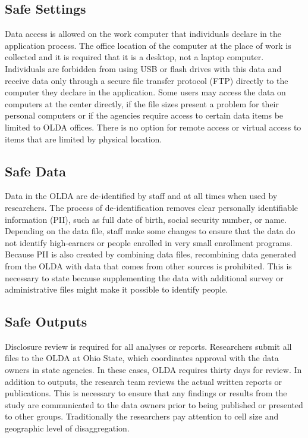 \hypertarget{safe-settings-1}{%
\subsection{Safe Settings}\label{safe-settings-1}}

Data access is allowed on the work computer that individuals declare in the application process. The office location of the computer at the place of work is collected and it is required that it is a desktop, not a laptop computer. Individuals are forbidden from using USB or flash drives with this data and receive data only through a secure file transfer protocol (FTP) directly to the computer they declare in the application. Some users may access the data on computers at the center directly, if the file sizes present a problem for their personal computers or if the agencies require access to certain data items be limited to OLDA offices. There is no option for remote access or virtual access to items that are limited by physical location.

\hypertarget{safe-data-1}{%
\subsection{Safe Data}\label{safe-data-1}}

Data in the OLDA are de-identified by staff and at all times when used by researchers. The process of de-identification removes clear personally identifiable information (PII), such as full date of birth, social security number, or name. Depending on the data file, staff make some changes to ensure that the data do not identify high-earners or people enrolled in very small enrollment programs. Because PII is also created by combining data files, recombining data generated from the OLDA with data that comes from other sources is prohibited. This is necessary to state because supplementing the data with additional survey or administrative files might make it possible to identify people.

\hypertarget{safe-outputs-1}{%
\subsection{Safe Outputs}\label{safe-outputs-1}}

Disclosure review is required for all analyses or reports. Researchers submit all files to the OLDA at Ohio State, which coordinates approval with the data owners in state agencies. In these cases, OLDA requires thirty days for review. In addition to outputs, the research team reviews the actual written reports or publications. This is necessary to ensure that any findings or results from the study are communicated to the data owners prior to being published or presented to other groups. Traditionally the researchers pay attention to cell size and geographic level of disaggregation.

